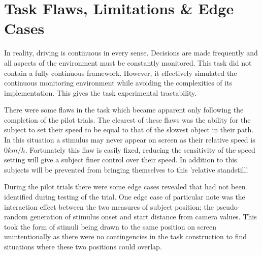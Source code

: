 \section{Task Flaws, Limitations \& Edge Cases}
In reality, driving is continuous in every sense. Decisions are made frequently and all aspects of the environment must be constantly monitored. This task did not contain a fully continuous framework. However, it effectively simulated the continuous monitoring environment while avoiding the complexities of its implementation. This gives the task experimental tractability.

There were some flaws in the task which became apparent only following the completion of the pilot trials. The clearest of these flaws was the ability for the subject to set their speed to be equal to that of the slowest object in their path. In this situation a stimulus may never appear on screen as their relative speed is $0km/h$. Fortunately this flaw is easily fixed, reducing the sensitivity of the speed setting will give a subject finer control over their speed. In addition to this subjects will be prevented from bringing themselves to this 'relative standstill'.

During the pilot trials there were some edge cases revealed that had not been identified during testing of the trial. One edge case of particular note was the interaction effect between the two measures of subject position; the pseudo-random generation of stimulus onset and start distance from camera values. This took the form of stimuli being drawn to the same position on screen unintentionally as there were no contingencies in the task construction to find situations where these two positions could overlap.


